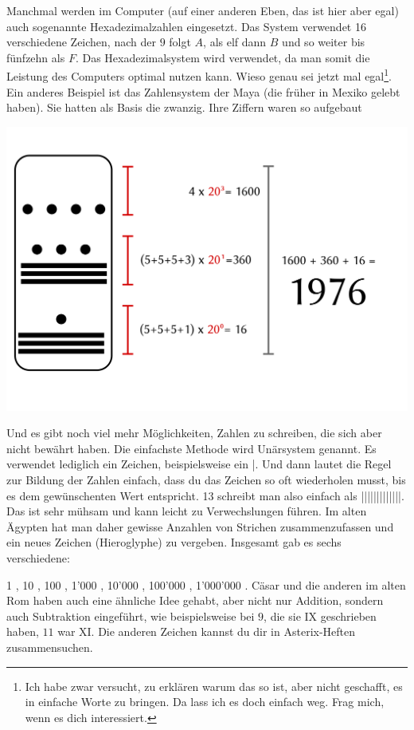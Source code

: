 Manchmal werden im Computer (auf einer anderen Eben, das ist hier aber egal) auch sogenannte Hexadezimalzahlen eingesetzt. Das System verwendet 16 verschiedene Zeichen, nach der $9$ folgt $A$, als elf dann $B$ und so weiter bis fünfzehn als $F$. Das Hexadezimalsystem wird verwendet, da man somit die Leistung des Computers optimal nutzen kann. Wieso genau sei jetzt mal egal\footnote{Ich habe zwar versucht, zu erklären warum das so ist, aber nicht geschafft, es in einfache Worte zu bringen. Da lass ich es doch einfach weg. Frag mich, wenn es dich interessiert.}. Ein anderes Beispiel ist das Zahlensystem der Maya (die früher in Mexiko gelebt haben). Sie hatten als Basis die zwanzig. Ihre Ziffern waren so aufgebaut

\includegraphics[width=\textwidth]{./bilder/Maya1976.png}

Und es gibt noch viel mehr Möglichkeiten, Zahlen zu schreiben, die sich aber nicht bewährt haben. Die einfachste Methode wird Unärsystem genannt. Es verwendet lediglich ein Zeichen, beispielsweise ein |. Und dann lautet die Regel zur Bildung der Zahlen einfach, dass du das Zeichen so oft wiederholen musst, bis es dem gewünschenten Wert entspricht. 13 schreibt man also einfach als |||||||||||||. Das ist sehr mühsam und kann leicht zu Verwechslungen führen. Im alten Ägypten hat man daher gewisse Anzahlen von Strichen zusammenzufassen und ein neues Zeichen (Hieroglyphe) zu vergeben. Insgesamt gab es sechs verschiedene:

1 \textpmhg{\Hone}, 10 , 100 , 1’000 , 10’000 , 100’000 , 1'000’000 . Cäsar und die anderen im alten Rom haben auch eine ähnliche Idee gehabt, aber nicht nur Addition, sondern auch Subtraktion eingeführt, wie beispielsweise bei $9$, die sie IX geschrieben haben, $11$ war XI. Die anderen Zeichen kannst du dir in Asterix-Heften zusammensuchen.

